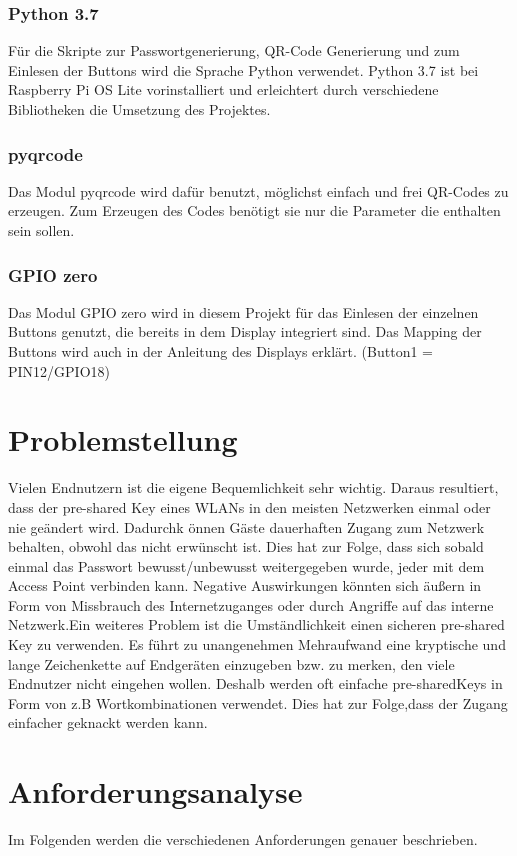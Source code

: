 \documentclass[a4paper,11pt,singlespacing]{article}
\begin{document}
    		\subsubsection{Python 3.7}
    			Für die Skripte zur Passwortgenerierung, QR-Code Generierung und zum Einlesen der Buttons wird die Sprache Python verwendet. Python 3.7 ist bei Raspberry Pi OS Lite  vorinstalliert und erleichtert durch verschiedene Bibliotheken die Umsetzung des Projektes.
    			\subsubsection{pyqrcode}
    				Das Modul pyqrcode wird dafür benutzt, möglichst einfach und frei QR-Codes zu erzeugen. Zum Erzeugen des Codes benötigt sie nur die Parameter die enthalten sein sollen. \cite{Quote_pyqrcode}
    			\subsubsection{GPIO zero}
    				Das Modul GPIO zero wird in diesem Projekt für das Einlesen der einzelnen Buttons genutzt, die bereits in dem Display integriert sind. Das Mapping der Buttons wird auch in der Anleitung des Displays erklärt. (Button1 = PIN12/GPIO18) \cite{Quote_gpio_zero}
    	
    	
    \section{Problemstellung}
    	Vielen Endnutzern ist die eigene Bequemlichkeit sehr wichtig. Daraus resultiert, dass der pre-shared Key eines WLANs in den meisten Netzwerken einmal oder nie geändert wird. Dadurchk önnen Gäste dauerhaften Zugang zum Netzwerk behalten, obwohl das nicht erwünscht ist. Dies hat zur Folge, dass sich sobald einmal das Passwort bewusst/unbewusst weitergegeben wurde, jeder mit dem Access Point verbinden kann. Negative Auswirkungen könnten sich äußern in Form von Missbrauch des Internetzuganges oder durch Angriffe auf das interne Netzwerk.Ein weiteres Problem ist die Umständlichkeit einen sicheren pre-shared Key zu verwenden. Es führt zu unangenehmen Mehraufwand eine kryptische und lange Zeichenkette auf Endgeräten einzugeben bzw. zu merken, den viele Endnutzer nicht eingehen wollen. Deshalb werden oft einfache pre-sharedKeys in Form von z.B Wortkombinationen verwendet. Dies hat zur Folge,dass der Zugang einfacher geknackt werden kann.
    	
   \section{Anforderungsanalyse}
    		Im Folgenden werden die verschiedenen Anforderungen genauer beschrieben.
\end{document}
